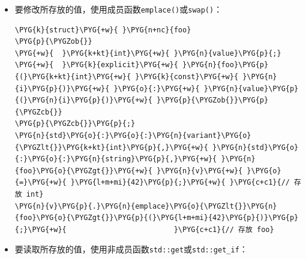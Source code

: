 \begin{itemize}
\item 要修改所存放的值，使用成员函数\texttt{emplace()}或\texttt{swap()}：



\begin{codeblockbg}
\begin{Verbatim}[commandchars=\\\{\},breaklines=true,breakanywhere=true,fontsize=\codefont,xleftmargin=17bp]
\PYG{k}{struct}\PYG{+w}{ }\PYG{n+nc}{foo}
\PYG{p}{\PYGZob{}}
\PYG{+w}{  }\PYG{k+kt}{int}\PYG{+w}{ }\PYG{n}{value}\PYG{p}{;}
\PYG{+w}{  }\PYG{k}{explicit}\PYG{+w}{ }\PYG{n}{foo}\PYG{p}{(}\PYG{k+kt}{int}\PYG{+w}{ }\PYG{k}{const}\PYG{+w}{ }\PYG{n}{i}\PYG{p}{)}\PYG{+w}{ }\PYG{o}{:}\PYG{+w}{ }\PYG{n}{value}\PYG{p}{(}\PYG{n}{i}\PYG{p}{)}\PYG{+w}{ }\PYG{p}{\PYGZob{}}\PYG{p}{\PYGZcb{}}
\PYG{p}{\PYGZcb{}}\PYG{p}{;}
\PYG{n}{std}\PYG{o}{:}\PYG{o}{:}\PYG{n}{variant}\PYG{o}{\PYGZlt{}}\PYG{k+kt}{int}\PYG{p}{,}\PYG{+w}{ }\PYG{n}{std}\PYG{o}{:}\PYG{o}{:}\PYG{n}{string}\PYG{p}{,}\PYG{+w}{ }\PYG{n}{foo}\PYG{o}{\PYGZgt{}}\PYG{+w}{ }\PYG{n}{v}\PYG{+w}{ }\PYG{o}{=}\PYG{+w}{ }\PYG{l+m+mi}{42}\PYG{p}{;}\PYG{+w}{ }\PYG{c+c1}{// 存放 int}
\PYG{n}{v}\PYG{p}{.}\PYG{n}{emplace}\PYG{o}{\PYGZlt{}}\PYG{n}{foo}\PYG{o}{\PYGZgt{}}\PYG{p}{(}\PYG{l+m+mi}{42}\PYG{p}{)}\PYG{p}{;}\PYG{+w}{                         }\PYG{c+c1}{// 存放 foo}
\end{Verbatim}
\end{codeblockbg}



\item 要读取所存放的值，使用非成员函数\texttt{std::\allowbreak{}get}或\texttt{std::\allowbreak{}get\_\allowbreak{}if}：




\end{itemize}
